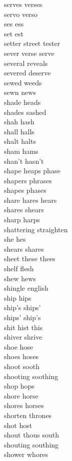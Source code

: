 serves verses\\
servo verso\\
ses ess\\
set est\\
setter street tester\\
sever verse serve\\
several reveals\\
severed deserve\\
sewed weeds\\
sewn news\\
shade heads\\
shades sashed\\
shah hash\\
shall halls\\
shalt halts\\
sham hams\\
shan't hasn't\\
shape heaps phase\\
shapers phrases\\
shapes phases\\
share hares hears\\
shares shears\\
sharp harps\\
shattering straighten\\
she hes\\
shears shares\\
sheet these thees\\
shelf flesh\\
shew hews\\
shingle english\\
ship hips\\
ship's ships'\\
ships' ship's\\
shit hist this\\
shiver shrive\\
shoe hose\\
shoes hoses\\
shoot sooth\\
shooting soothing\\
shop hops\\
shore horse\\
shores horses\\
shorten thrones\\
shot host\\
shout thous south\\
shouting southing\\
shower whores\\
